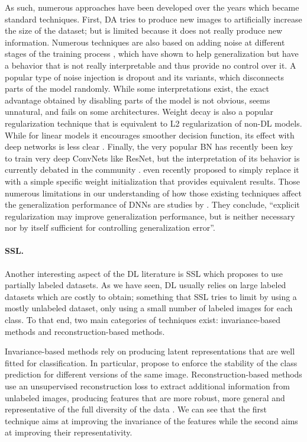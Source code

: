 As such, numerous approaches have been developed over the years which became standard techniques. First, \acf{DA} \citep{dataaugmentation} tries to produce new images to artificially increase the size of the dataset; but is limited because it does not really produce new information. Numerous techniques are also based on adding noise at different stages of the training process \citep[\textit{cf.}][]{kukavcka2017regularization}, which have shown to help generalization but have a behavior that is not really interpretable and thus provide no control over it. A popular type of noise injection is dropout \citep{dropout} and its variants, which disconnects parts of the model randomly. While some interpretations exist, the exact advantage obtained by disabling parts of the model is not obvious, seems unnatural, and fails on some architectures. Weight decay \citep{weightdecay} is also a popular regularization technique that is equivalent to L2 regularization of non-\ac{DL} models. While for linear models it encourages smoother decision function, its effect with deep networks is less clear \citep{rethinking}. Finally, the very popular \acf{BN} \citep{batchnorm} has recently been key to train very deep \acp{ConvNet} like ResNet, but the interpretation of its behavior is currently debated in the community \citep[\textit{cf.}][]{santurkar2018does}. \citet{zhang2019fixup} even recently proposed to simply replace it with a simple specific weight initialization that provides equivalent results. Those numerous limitations in our understanding of how those existing techniques affect the generalization performance of \acfp{DNN} are studies by \citet{rethinking}. They conclude, ``explicit regularization may improve generalization performance, but is neither necessary nor by itself sufficient for controlling generalization error''.

\paragraph{\acl{SSL}.} Another interesting aspect of the \ac{DL} literature is \acf{SSL} which proposes to use partially labeled datasets. As we have seen, \ac{DL} usually relies on large labeled datasets which are costly to obtain; something that \ac{SSL} tries to limit by using a mostly unlabeled dataset, only using a small number of labeled images for each class. To that end, two main categories of techniques exist: invariance-based methods and reconstruction-based methods.

Invariance-based methods rely on producing latent representations that are well fitted for classification. In particular, \citet{Sajjadi2016,Laine2016,Tarvainen2017} propose to enforce the stability of the class prediction for different versions of the same image. Reconstruction-based methods use an unsupervised reconstruction loss to extract additional information from unlabeled images, producing features that are more robust, more general and representative of the full diversity of the data \citep{Ranzato2008}. We can see that the first technique aims at improving the invariance of the features while the second aims at improving their representativity.

